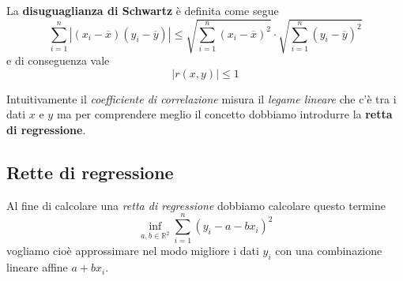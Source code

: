 \begin{definition}
	La \textbf{disuguaglianza di Schwartz} è definita come segue
	\[
		\sum_{i=1}^n |(x_i - \overline{x}) (y_i - \overline{y})| \leq
		\sqrt{\sum_{i=1}^n (x_i - \overline{x})^2} \cdot \sqrt{\sum_{i=1}^n (y_i - \overline{y})^2}
	\]
	e di conseguenza vale \[ |r(x, y)| \leq 1 \]
\end{definition}

Intuitivamente il \emph{coefficiente di correlazione} misura il \emph{legame lineare} che c'è tra i dati $x$ e $y$
ma per comprendere meglio il concetto dobbiamo introdurre la \textbf{retta di regressione}.

\subsection{Rette di regressione}
Al fine di calcolare una \emph{retta di regressione} dobbiamo calcolare questo termine
\[ \inf_{a,b \in \mathbb{R}^2} \sum_{i=1}^n (y_i - a - b x_i)^2 \]
vogliamo cioè approssimare nel modo migliore i dati $y_i$ con una combinazione lineare affine $a + b x_i$.

